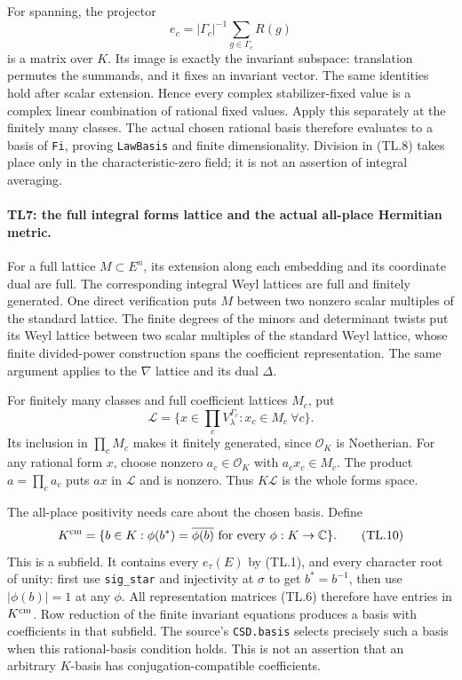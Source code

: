 \documentclass[11pt,a4paper]{article}
\numberwithin{equation}{section}
\theoremstyle{remark}\newtheorem{remark}[theorem]{Remark}
\begin{document}
For spanning, the projector
\[
 e_c=|\Gamma_c|^{-1}\sum_{g\in\Gamma_c}R(g)        \tag{TL.8}
\]
is a matrix over $K$. Its image is exactly the invariant subspace:
translation permutes the summands, and it fixes an invariant vector.
The same identities hold after scalar extension. Hence every complex
stabilizer-fixed value is a complex linear combination of rational
fixed values. Apply this separately at the finitely many classes.
The actual chosen rational basis therefore evaluates to a basis of
\texttt{Fi}, proving \texttt{LawBasis} and finite dimensionality.
Division in (TL.8) takes place only in the characteristic-zero
field; it is not an assertion of integral averaging.

\paragraph{TL7: the full integral forms lattice and the actual
all-place Hermitian metric.}
For a full lattice $M\subset E^n$, its extension along each embedding
and its coordinate dual are full. The corresponding integral Weyl
lattices are full and finitely generated. One direct verification
puts $M$ between two nonzero scalar multiples of the standard
lattice. The finite degrees of the minors and determinant twists
put its Weyl lattice between two scalar multiples of the standard
Weyl lattice, whose finite divided-power construction spans the
coefficient representation. The same argument applies to the
$\nabla$ lattice and its dual $\Delta$.

For finitely many classes and full coefficient lattices $M_c$, put
\[
 \mathcal L=\{x\in\textstyle\prod_cV_\lambda^{\Gamma_c}:
                         x_c\in M_c\ \forall c\}. \tag{TL.9}
\]
Its inclusion in $\prod_c M_c$ makes it finitely generated, since
$\mathcal O_K$ is Noetherian. For any rational form $x$, choose
nonzero $a_c\in\mathcal O_K$ with $a_cx_c\in M_c$. The product
$a=\prod_c a_c$ puts $ax$ in $\mathcal L$ and is nonzero.
Thus $K\mathcal L$ is the whole forms space.

The all-place positivity needs care about the chosen basis. Define
\[
 K^{\rm cm}=\{b\in K:\phi(b^*)=\overline{\phi(b)}
                       \text{ for every }\phi:K\to\mathbb C\}.
 \tag{TL.10}
\]
This is a subfield. It contains every $e_\tau(E)$ by (TL.1), and
every character root of unity: first use \texttt{sig\_\allowbreak star} and
injectivity at $\sigma$ to get $b^*=b^{-1}$, then use $|\phi(b)|=1$
at any $\phi$. All representation matrices (TL.6) therefore have
entries in $K^{\rm cm}$. Row reduction of the finite invariant
equations produces a basis with coefficients in that subfield.
The source's \texttt{CSD.basis} selects precisely such a basis when
this rational-basis condition holds. This is not an assertion that
an arbitrary $K$-basis has conjugation-compatible coefficients.
\end{document}
